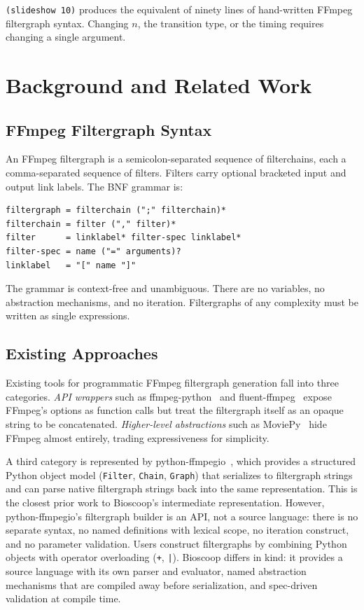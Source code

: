 \documentclass[conference]{IEEEtran}
\begin{document}
\texttt{(slideshow 10)} produces the equivalent of ninety lines of hand-written FFmpeg filtergraph syntax. Changing $n$, the transition type, or the timing requires changing a single argument.

\section{Background and Related Work}

\subsection{FFmpeg Filtergraph Syntax}

An FFmpeg filtergraph is a semicolon-separated sequence of filterchains, each a comma-separated sequence of filters. Filters carry optional bracketed input and output link labels. The BNF grammar is:

\begin{lstlisting}[language=BNF, caption={FFmpeg filtergraph grammar (simplified)}]
filtergraph = filterchain (";" filterchain)*
filterchain = filter ("," filter)*
filter      = linklabel* filter-spec linklabel*
filter-spec = name ("=" arguments)?
linklabel   = "[" name "]"
\end{lstlisting}

The grammar is context-free and unambiguous. There are no variables, no abstraction mechanisms, and no iteration. Filtergraphs of any complexity must be written as single expressions.

\subsection{Existing Approaches}

Existing tools for programmatic FFmpeg filtergraph generation fall into three categories. \emph{API wrappers} such as ffmpeg-python~\cite{ffmpegpython} and fluent-ffmpeg~\cite{fluentffmpeg} expose FFmpeg's options as function calls but treat the filtergraph itself as an opaque string to be concatenated. \emph{Higher-level abstractions} such as MoviePy~\cite{moviepy} hide FFmpeg almost entirely, trading expressiveness for simplicity.

A third category is represented by python-ffmpegio~\cite{ffmpegio}, which provides a structured Python object model (\texttt{Filter}, \texttt{Chain}, \texttt{Graph}) that serializes to filtergraph strings and can parse native filtergraph strings back into the same representation. This is the closest prior work to Bioscoop's intermediate representation. However, python-ffmpegio's filtergraph builder is an API, not a source language: there is no separate syntax, no named definitions with lexical scope, no iteration construct, and no parameter validation. Users construct filtergraphs by combining Python objects with operator overloading (\texttt{+}, \texttt{|}). Bioscoop differs in kind: it provides a source language with its own parser and evaluator, named abstraction mechanisms that are compiled away before serialization, and spec-driven validation at compile time.
\end{document}
